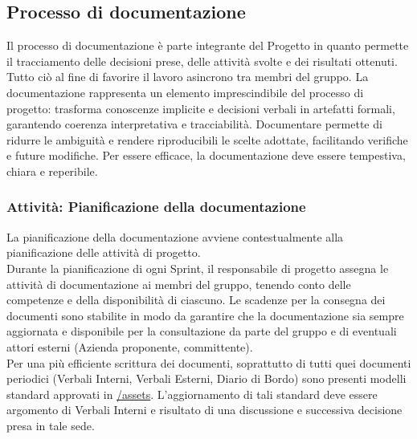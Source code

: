 \documentclass[a4paper,12pt]{article}
\begin{document}
\subsection{Processo di documentazione} \label{documentazione}
Il processo di documentazione è parte integrante del Progetto in quanto
permette il tracciamento delle decisioni prese, delle attività svolte e dei
risultati ottenuti. Tutto ciò al fine di favorire il lavoro asincrono tra
membri del gruppo. 
La documentazione rappresenta un elemento imprescindibile del processo di progetto: trasforma conoscenze implicite e decisioni verbali in artefatti formali, garantendo coerenza interpretativa e tracciabilità.
Documentare permette di ridurre le ambiguità e rendere riproducibili le scelte adottate, facilitando verifiche e future modifiche.
Per essere efficace, la documentazione deve essere tempestiva, chiara e reperibile.

\subsubsection{Attività: Pianificazione della documentazione} \label{pianificazioneDocs}
La pianificazione della documentazione avviene contestualmente alla
pianificazione delle attività di progetto. \\Durante la pianificazione di ogni
Sprint, il responsabile di progetto assegna le attività
di documentazione ai membri del gruppo, tenendo conto delle competenze e della
disponibilità di ciascuno. Le scadenze per la consegna dei documenti sono
stabilite in modo da garantire che la documentazione sia sempre aggiornata e
disponibile per la consultazione da parte del gruppo e di eventuali attori
esterni (Azienda proponente, committente). \\Per una
più efficiente scrittura dei documenti, soprattutto di tutti quei documenti
periodici (Verbali Interni, Verbali Esterni, Diario di Bordo) sono presenti
modelli standard approvati in
\href{https://github.com/7-ZPUs/Docs/tree/main/assets}{/assets}.
L'aggiornamento di tali standard deve essere argomento di Verbali Interni e
risultato di una discussione e successiva decisione presa in tale sede.
\end{document}
